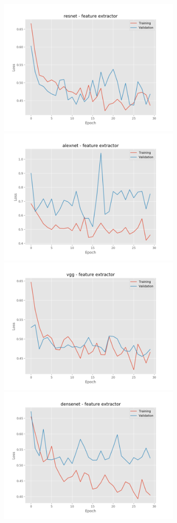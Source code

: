 \documentclass[]{kththesis}
\begin{document}
  \begin{figure}[h]
    \includegraphics[width=9cm]{f_l_resnet_fe}
    \includegraphics[width=9cm]{f_l_alexnet_fe}
    \includegraphics[width=9cm]{f_l_vgg_fe}
    \includegraphics[width=9cm]{f_l_densenet_fe}

\end{figure}
\end{document}
